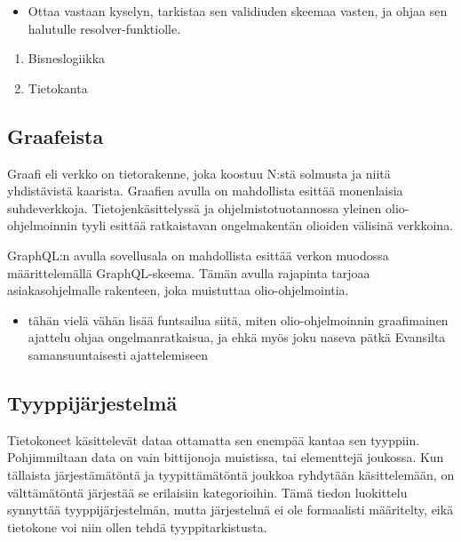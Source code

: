 \begin{itemize}
\tightlist
\item
  Ottaa vastaan kyselyn, tarkistaa sen validiuden skeemaa vasten, ja
  ohjaa sen halutulle resolver-funktiolle.
\end{itemize}

\begin{enumerate}
\def\labelenumi{\arabic{enumi}.}
\setcounter{enumi}{2}
\tightlist
\item
  Bisneslogiikka
\item
  Tietokanta
\end{enumerate}

\hypertarget{graafeista}{%
\subsection{Graafeista}\label{graafeista}}

Graafi eli verkko on tietorakenne, joka koostuu N:stä solmusta ja niitä
yhdistävistä kaarista.\cite{pozrikidis2014introduction} Graafien avulla
on mahdollista esittää monenlaisia suhdeverkkoja. Tietojenkäsittelyssä
ja ohjelmistotuotannossa yleinen olio-ohjelmoinnin tyyli esittää
ratkaistavan ongelmakentän olioiden välisinä
verkkoina.\cite{booch2008object}

GraphQL:n avulla sovellusala on mahdollista esittää verkon muodossa
määrittelemällä GraphQL-skeema. Tämän avulla rajapinta tarjoaa
asiakasohjelmalle rakenteen, joka muistuttaa
olio-ohjelmointia.\cite{thinkingInGraphsOct2021}

\begin{itemize}
\tightlist
\item
  tähän vielä vähän lisää funtsailua siitä, miten olio-ohjelmoinnin
  graafimainen ajattelu ohjaa ongelmanratkaisua, ja ehkä myös joku
  naseva pätkä Evansilta samansuuntaisesti ajattelemiseen
\end{itemize}

\hypertarget{tyyppijuxe4rjestelmuxe4}{%
\subsection{Tyyppijärjestelmä}\label{tyyppijuxe4rjestelmuxe4}}

Tietokoneet käsittelevät dataa ottamatta sen enempää kantaa sen
tyyppiin. Pohjimmiltaan data on vain bittijonoja muistissa, tai
elementtejä joukossa. Kun tällaista järjestämätöntä ja tyypittämätöntä
joukkoa ryhdytään käsittelemään, on välttämätöntä järjestää se
erilaisiin kategorioihin. Tämä tiedon luokittelu synnyttää
tyyppijärjestelmän, mutta järjestelmä ei ole formaalisti määritelty,
eikä tietokone voi niin ollen tehdä tyyppitarkistusta.

